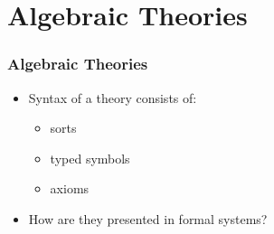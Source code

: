 \documentclass[t,12pt,numbers,fleqn,usenames,xcolor=dvipsnames]{beamer}
\begin{document}

\section{Algebraic Theories}
\begin{frame}[fragile]
\frametitle{Algebraic Theories}
\begin{itemize}
\item Syntax of a theory consists of: 	
	   \begin{itemize}
	   	\item sorts
	   	\item typed symbols
	   	\item axioms 
	   \end{itemize}
   \pause
   \item How are they presented in formal systems?
\end{itemize}
\end{frame}
\end{document}
